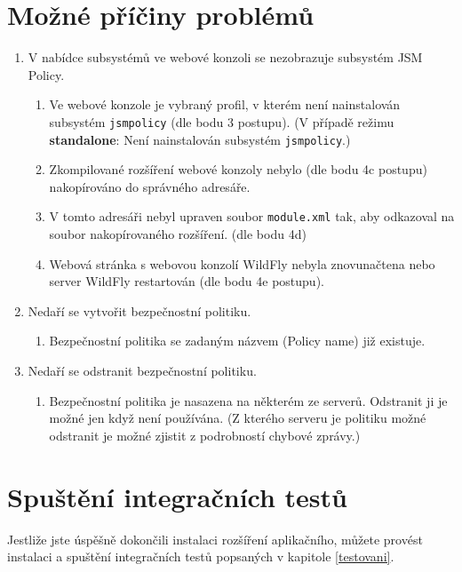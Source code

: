 \begin{enumerate}
\end{enumerate}


\section{Možné příčiny problémů}
\begin{enumerate}
    \item V nabídce subsystémů ve webové konzoli se nezobrazuje subsystém JSM Policy.
    \begin{enumerate}
        \item Ve webové konzole je vybraný profil, v kterém není nainstalován subsystém {\tt jsmpolicy} (dle bodu 3 postupu). (V případě režimu {\bf standalone}: Není nainstalován subsystém {\tt jsmpolicy}.)
        \item Zkompilované rozšíření webové konzoly nebylo (dle bodu 4c postupu) nakopírováno do správného adresáře.
        \item V tomto adresáři nebyl upraven soubor {\tt module.xml} tak, aby odkazoval na soubor nakopírovaného rozšíření. (dle bodu 4d)
        \item Webová stránka s webovou konzolí WildFly nebyla znovunačtena nebo server WildFly restartován (dle bodu 4e postupu).
    \end{enumerate}
    \item Nedaří se vytvořit bezpečnostní politiku.
    \begin{enumerate}
        \item Bezpečnostní politika se zadaným názvem (Policy name) již existuje.
    \end{enumerate}
    \item Nedaří se odstranit bezpečnostní politiku.
    \begin{enumerate}
        \item Bezpečnostní politika je nasazena na některém ze serverů. Odstranit ji je možné jen když není používána. (Z kterého serveru je politiku možné odstranit je možné zjistit z podrobností chybové zprávy.)
    \end{enumerate}
\end{enumerate}


\section{Spuštění integračních testů}

Jestliže jste úspěšně dokončili instalaci rozšíření aplikačního, můžete provést instalaci a spuštění integračních testů popsaných v kapitole \ref{testovani}.

